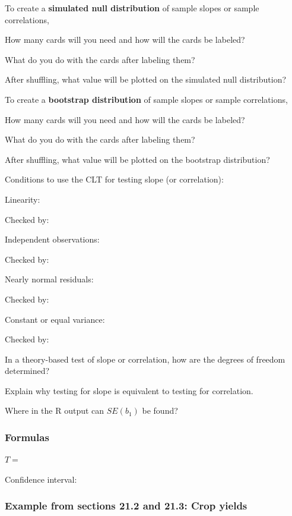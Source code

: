 \documentclass[
]{report}
\newcommand{\rgs}{\vspace{12pt}} %
\newcommand{\rgi}{\hspace{24pt}}  %
\begin{document}
To create a \textbf{simulated null distribution} of sample slopes or sample correlations,

\rgi How many cards will you need and how will the cards be labeled?
\rgs

\rgi What do you do with the cards after labeling them?
\rgs

\rgi After shuffling, what value will be plotted on the simulated null distribution?
\rgs

To create a \textbf{bootstrap distribution} of sample slopes or sample correlations,

\rgi How many cards will you need and how will the cards be labeled?
\rgs

\rgi What do you do with the cards after labeling them?
\rgs

\rgi After shuffling, what value will be plotted on the bootstrap distribution?
\rgs

Conditions to use the CLT for testing slope (or correlation):

\rgi Linearity:
\rgs

\rgi \rgi Checked by:
\rgs

\rgi Independent observations:
\rgs

\rgi \rgi Checked by:
\rgs

\rgi Nearly normal residuals:
\rgs

\rgi \rgi Checked by:
\rgs

\rgi Constant or equal variance:
\rgs

\rgi \rgi Checked by:
\rgs

In a theory-based test of slope or correlation, how are the degrees of freedom determined?
\rgs    

Explain why testing for slope is equivalent to testing for correlation.
\rgs

Where in the R output can \(SE(b_1)\) be found?
\rgs

\hypertarget{formulas-6}{%
\subsubsection*{Formulas}\label{formulas-6}}

\(T=\)
\rgs

Confidence interval:
\rgs

\hypertarget{example-from-sections-21.2-and-21.3-crop-yields}{%
\subsubsection*{Example from sections 21.2 and 21.3: Crop yields}\label{example-from-sections-21.2-and-21.3-crop-yields}}
\end{document}
